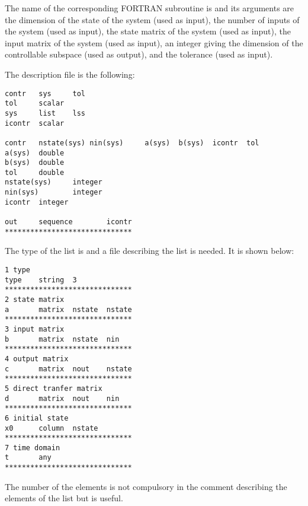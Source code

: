 The name of the corresponding FORTRAN subroutine is  and its
arguments are the dimension of the state of the system (used as input), the
number of inputs of the system (used as input), 
the state matrix of the system (used as input),
the input matrix of the system (used as input),
an integer giving the dimension of the controllable subspace (used as output),
and the tolerance (used as input).

The description file is the following:
\begin{verbatim}
contr   sys     tol
tol     scalar
sys     list    lss
icontr  scalar

contr   nstate(sys)	nin(sys)     a(sys)  b(sys)  icontr  tol
a(sys)  double
b(sys)  double
tol     double
nstate(sys)     integer
nin(sys)        integer
icontr  integer

out     sequence        icontr
******************************
\end{verbatim}

The type of the list is  and a file describing the list  is
needed. It is shown below:

\begin{verbatim}
1 type
type    string  3
******************************
2 state matrix
a       matrix  nstate  nstate
******************************
3 input matrix
b       matrix  nstate  nin
******************************
4 output matrix
c       matrix  nout    nstate
******************************
5 direct tranfer matrix
d       matrix  nout    nin
******************************
6 initial state
x0      column  nstate
******************************
7 time domain
t       any
******************************
\end{verbatim}

The number of the elements is not compulsory in the comment describing the
elements of the list but is useful.
\newpage

\tableofcontents

\listoftables


